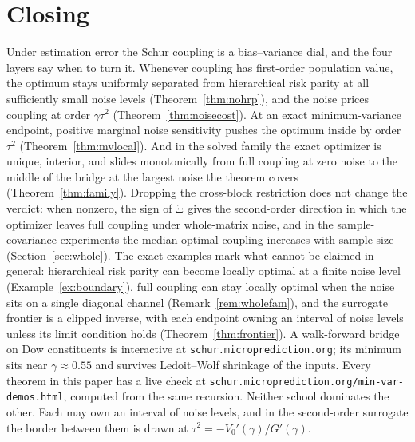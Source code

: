 \documentclass[11pt]{article}
\theoremstyle{remark}
\begin{document}
\section{Closing}

Under estimation error the Schur coupling is a bias--variance
dial, and the four layers say when to turn it. Whenever coupling has
first-order population value, the optimum stays uniformly separated from
hierarchical risk parity at all sufficiently small noise levels
(Theorem~\ref{thm:nohrp}), and the noise prices coupling at order
$\gamma\tau^2$ (Theorem~\ref{thm:noisecost}). At an exact minimum-variance
endpoint, positive marginal noise sensitivity pushes the optimum inside by
order $\tau^2$ (Theorem~\ref{thm:mvlocal}). And in the solved family the
exact optimizer is unique, interior, and slides monotonically from full
coupling at zero noise to the middle of the bridge at the largest noise
the theorem covers (Theorem~\ref{thm:family}). Dropping the cross-block
restriction does not change the verdict: when nonzero, the sign of $\Xi$
gives the second-order direction in which the optimizer leaves full
coupling under whole-matrix noise, and in the sample-covariance
experiments the median-optimal coupling increases with sample size
(Section~\ref{sec:whole}). The exact examples mark what
cannot be claimed in general: hierarchical risk parity can become locally
optimal at a finite noise level (Example~\ref{ex:boundary}), full coupling
can stay locally optimal when the noise sits on a single diagonal channel
(Remark~\ref{rem:wholefam}), and the
surrogate frontier is a clipped inverse, with each endpoint owning an
interval of noise levels unless its limit condition holds
(Theorem~\ref{thm:frontier}). A walk-forward bridge on Dow constituents is
interactive at \texttt{schur.microprediction.org}; its minimum sits near
$\gamma \approx 0.55$ and survives Ledoit--Wolf shrinkage of the inputs.
Every theorem in this paper has a live check at
\texttt{schur.microprediction.org/min-var-demos.html}, computed from the
same recursion.
Neither school dominates the other. Each may own an interval of noise
levels, and in the second-order surrogate the border between them is drawn
at $\tau^2 = -V_0'(\gamma)/G'(\gamma)$.
\end{document}
